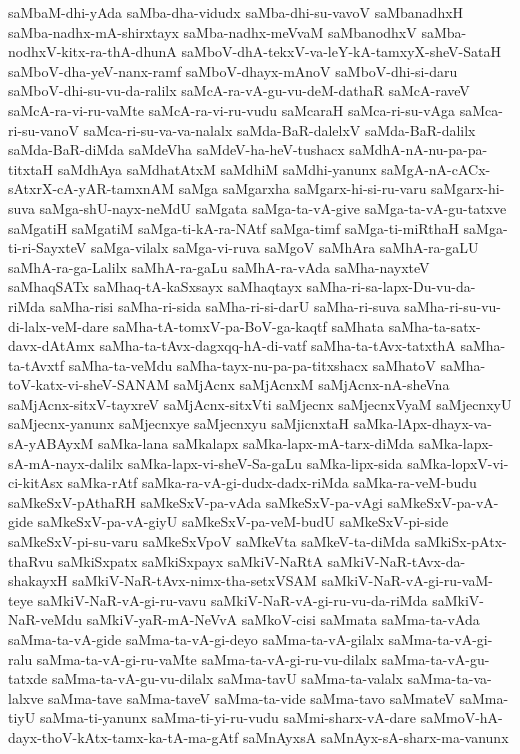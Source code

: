 {saMbaM-dhi-yAda
saMba-dha-vidudx
saMba-dhi-su-vavoV
saMbanadhxH
saMba-nadhx-mA-shirxtayx
saMba-nadhx-meVvaM
saMbanodhxV
saMba-nodhxV-kitx-ra-thA-dhunA
saMboV-dhA-tekxV-va-leY-kA-tamxyX-sheV-SataH
saMboV-dha-yeV-nanx-ramf
saMboV-dhayx-mAnoV
saMboV-dhi-si-daru
saMboV-dhi-su-vu-da-ralilx
saMcA-ra-vA-gu-vu-deM-dathaR
saMcA-raveV
saMcA-ra-vi-ru-vaMte
saMcA-ra-vi-ru-vudu
saMcaraH
saMca-ri-su-vAga
saMca-ri-su-vanoV
saMca-ri-su-va-va-nalalx
saMda-BaR-dalelxV
saMda-BaR-dalilx
saMda-BaR-diMda
saMdeVha
saMdeV-ha-heV-tushacx
saMdhA-nA-nu-pa-pa-titxtaH
saMdhAya
saMdhatAtxM
saMdhiM
saMdhi-yanunx
saMgA-nA-cACx-sAtxrX-cA-yAR-tamxnAM
saMga
saMgarxha
saMgarx-hi-si-ru-varu
saMgarx-hi-suva
saMga-shU-nayx-neMdU
saMgata
saMga-ta-vA-give
saMga-ta-vA-gu-tatxve
saMgatiH
saMgatiM
saMga-ti-kA-ra-NAtf
saMga-timf
saMga-ti-miRthaH
saMga-ti-ri-SayxteV
saMga-vilalx
saMga-vi-ruva
saMgoV
saMhAra
saMhA-ra-gaLU
saMhA-ra-ga-Lalilx
saMhA-ra-gaLu
saMhA-ra-vAda
saMha-nayxteV
saMhaqSATx
saMhaq-tA-kaSxsayx
saMhaqtayx
saMha-ri-sa-lapx-Du-vu-da-riMda
saMha-risi
saMha-ri-sida
saMha-ri-si-darU
saMha-ri-suva
saMha-ri-su-vu-di-lalx-veM-dare
saMha-tA-tomxV-pa-BoV-ga-kaqtf
saMhata
saMha-ta-satx-davx-dAtAmx
saMha-ta-tAvx-dagxqq-hA-di-vatf
saMha-ta-tAvx-tatxthA
saMha-ta-tAvxtf
saMha-ta-veMdu
saMha-tayx-nu-pa-pa-titxshacx
saMhatoV
saMha-toV-katx-vi-sheV-SANAM
saMjAcnx
saMjAcnxM
saMjAcnx-nA-sheVna
saMjAcnx-sitxV-tayxreV
saMjAcnx-sitxVti
saMjecnx
saMjecnxVyaM
saMjecnxyU
saMjecnx-yanunx
saMjecnxye
saMjecnxyu
saMjicnxtaH
saMka-lApx-dhayx-va-sA-yABAyxM
saMka-lana
saMkalapx
saMka-lapx-mA-tarx-diMda
saMka-lapx-sA-mA-nayx-dalilx
saMka-lapx-vi-sheV-Sa-gaLu
saMka-lipx-sida
saMka-lopxV-vi-ci-kitAsx
saMka-rAtf
saMka-ra-vA-gi-dudx-dadx-riMda
saMka-ra-veM-budu
saMkeSxV-pAthaRH
saMkeSxV-pa-vAda
saMkeSxV-pa-vAgi
saMkeSxV-pa-vA-gide
saMkeSxV-pa-vA-giyU
saMkeSxV-pa-veM-budU
saMkeSxV-pi-side
saMkeSxV-pi-su-varu
saMkeSxVpoV
saMkeVta
saMkeV-ta-diMda
saMkiSx-pAtx-thaRvu
saMkiSxpatx
saMkiSxpayx
saMkiV-NaRtA
saMkiV-NaR-tAvx-da-shakayxH
saMkiV-NaR-tAvx-nimx-tha-setxVSAM
saMkiV-NaR-vA-gi-ru-vaM-teye
saMkiV-NaR-vA-gi-ru-vavu
saMkiV-NaR-vA-gi-ru-vu-da-riMda
saMkiV-NaR-veMdu
saMkiV-yaR-mA-NeVvA
saMkoV-cisi
saMmata
saMma-ta-vAda
saMma-ta-vA-gide
saMma-ta-vA-gi-deyo
saMma-ta-vA-gilalx
saMma-ta-vA-gi-ralu
saMma-ta-vA-gi-ru-vaMte
saMma-ta-vA-gi-ru-vu-dilalx
saMma-ta-vA-gu-tatxde
saMma-ta-vA-gu-vu-dilalx
saMma-tavU
saMma-ta-valalx
saMma-ta-va-lalxve
saMma-tave
saMma-taveV
saMma-ta-vide
saMma-tavo
saMmateV
saMma-tiyU
saMma-ti-yanunx
saMma-ti-yi-ru-vudu
saMmi-sharx-vA-dare
saMmoV-hA-dayx-thoV-kAtx-tamx-ka-tA-ma-gAtf
saMnAyxsA
saMnAyx-sA-sharx-ma-vanunx
}
